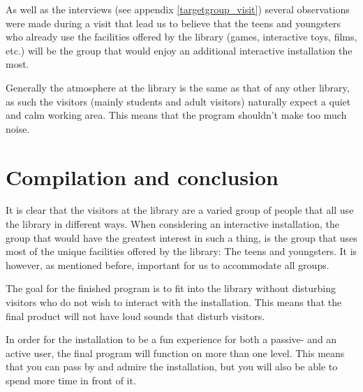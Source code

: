 As well as the interviews (see appendix \ref{targetgroup_visit}) several observations were made during a visit that lead us to believe that the teens and youngsters who already use the facilities offered by the library (games, interactive toys, films, etc.) will be the group that would enjoy an additional interactive installation the most.

Generally the atmosphere at the library is the same as that of any other library, as such the visitors (mainly students and adult visitors) naturally expect a quiet and calm working area. This means that the program shouldn't make too much noise.

\section{Compilation and conclusion}

It is clear that the visitors at the library are a varied group of people that all use the library in different ways. When considering an interactive installation, the group that would have the greatest interest in such a thing, is the group that uses most of the unique facilities offered by the library: The teens and youngsters. It is however, as mentioned before, important for us to accommodate all groups.

The goal for the finished program is to fit into the library without disturbing visitors who do not wish to interact with the installation. This means that the final product will not have loud sounds that disturb visitors.

In order for the installation to be a fun experience for both a passive- and an active user, the final program will function on more than one level. This means that you can pass by and admire the installation, but you will also be able to spend more time in front of it.